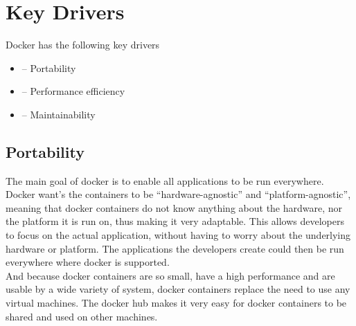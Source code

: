 
\section{Key Drivers}
\label{sec:keydrivers}

Docker has the following key drivers
\begin{itemize}
	\item {}-- Portability
	\item {}-- Performance efficiency
	\item {}-- Maintainability
\end{itemize}
%
\subsection*{Portability}
%

%



The main goal of docker is to enable all applications to be run everywhere. Docker want's the containers to be ``hardware-agnostic'' and ``platform-agnostic'', meaning that docker containers do not know anything about the hardware, nor the platform it is run on, thus making it very adaptable. This allows developers to focus on the actual application, without having to worry about the underlying hardware or platform. The applications the developers create could then be run everywhere where docker is supported.\\
And because docker containers are so small, have a high performance and are usable by a wide variety of system, docker containers replace the need to use any virtual machines.
 The docker hub makes it very easy for docker containers to be shared and used on other machines.

